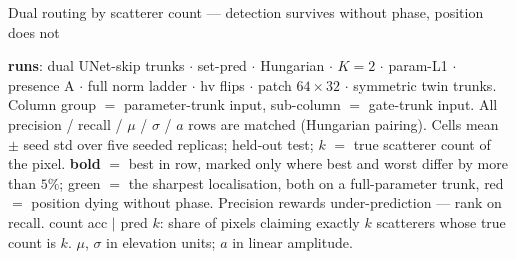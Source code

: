 \begin{frame}{Dual routing by scatterer count --- detection survives without phase, position does not}
  \parbox{0.82\textwidth}{\tiny\color{soft} \textbf{runs}: dual UNet-skip trunks $\cdot$ set-pred $\cdot$ Hungarian $\cdot$ $K{=}2$ $\cdot$ param-L1 $\cdot$ presence A $\cdot$ full norm ladder $\cdot$ hv flips $\cdot$ patch $64{\times}32$ $\cdot$ symmetric twin trunks. Column group $=$ parameter-trunk input, sub-column $=$ gate-trunk input. All precision / recall / $\mu$ / $\sigma$ / $a$ rows are matched (Hungarian pairing). Cells mean $\pm$ seed std over five seeded replicas; held-out test; $k$ $=$ true scatterer count of the pixel. \textbf{bold} $=$ best in row, marked only where best and worst differ by more than $5\%$; \textcolor{good}{green} $=$ the sharpest localisation, both on a full-parameter trunk, \textcolor{accent}{red} $=$ position dying without phase. Precision rewards under-prediction --- rank on recall. count acc $\mid$ pred $k$: share of pixels claiming exactly $k$ scatterers whose true count is $k$. $\mu$, $\sigma$ in elevation units; $a$ in linear amplitude.\par}
    

\end{frame}

